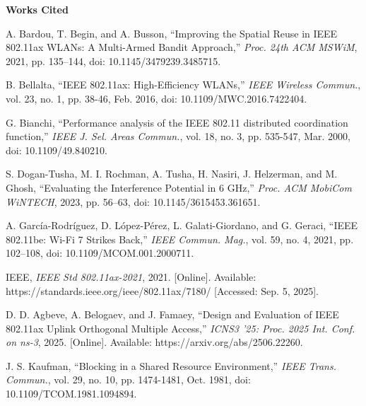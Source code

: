 \documentclass[12pt]{article}
\begin{document}
\begin{center}
    \textbf{Works Cited}
\end{center}

\vspace{1em}

\begin{enumerate}[label={[\arabic*]}, leftmargin=*, itemsep=1em]

\item A. Bardou, T. Begin, and A. Busson, ``Improving the Spatial Reuse in IEEE 802.11ax WLANs: A Multi-Armed Bandit Approach,'' \textit{Proc. 24th ACM MSWiM}, 2021, pp. 135–144, doi: 10.1145/3479239.3485715.

\item B. Bellalta, ``IEEE 802.11ax: High-Efficiency WLANs,'' \textit{IEEE Wireless Commun.}, vol. 23, no. 1, pp. 38-46, Feb. 2016, doi: 10.1109/MWC.2016.7422404.

\item G. Bianchi, ``Performance analysis of the IEEE 802.11 distributed coordination function,'' \textit{IEEE J. Sel. Areas Commun.}, vol. 18, no. 3, pp. 535-547, Mar. 2000, doi: 10.1109/49.840210.

\item S. Dogan-Tusha, M. I. Rochman, A. Tusha, H. Nasiri, J. Helzerman, and M. Ghosh, ``Evaluating the Interference Potential in 6 GHz,'' \textit{Proc. ACM MobiCom WiNTECH}, 2023, pp. 56–63, doi: 10.1145/3615453.361651.

\item A. García-Rodríguez, D. López-Pérez, L. Galati-Giordano, and G. Geraci, ``IEEE 802.11be: Wi-Fi 7 Strikes Back,'' \textit{IEEE Commun. Mag.}, vol. 59, no. 4, 2021, pp. 102–108, doi: 10.1109/MCOM.001.2000711.

\item IEEE, \textit{IEEE Std 802.11ax-2021}, 2021. [Online]. Available: https://standards.ieee.org/ieee/802.11ax/7180/ [Accessed: Sep. 5, 2025].

\item D. D. Agbeve, A. Belogaev, and J. Famaey, ``Design and Evaluation of IEEE 802.11ax Uplink Orthogonal Multiple Access,'' \textit{ICNS3 '25: Proc. 2025 Int. Conf. on ns-3}, 2025. [Online]. Available: https://arxiv.org/abs/2506.22260.

\item J. S. Kaufman, ``Blocking in a Shared Resource Environment,'' \textit{IEEE Trans. Commun.}, vol. 29, no. 10, pp. 1474-1481, Oct. 1981, doi: 10.1109/TCOM.1981.1094894.


\end{enumerate}
\end{document}
